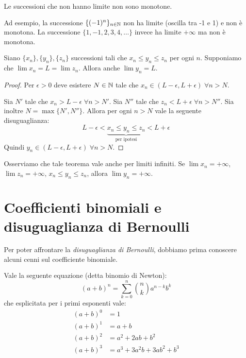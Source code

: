 \begin{remark}
Le successioni che non hanno limite non sono monotone.
\end{remark}
Ad esempio, la successione $\{(-1)^n\}_{n \in \mathbb N}$ non ha limite (oscilla tra -1 e 1) e non è monotona. La successione $\{1, -1, 2, 3, 4, \ldots \}$ invece ha limite $+\infty$ ma non è monotona.

\begin{theorem}
Siano $\{x_n\}, \{y_n\}, \{z_n\}$ successioni tali che $x_n \le y_n \le z_n$ per ogni $n$. Supponiamo che $\lim x_n = L = \lim z_n$. Allora anche $\lim y_n = L$.
\end{theorem}

\begin{proof}
Per $\epsilon > 0$ deve esistere $N \in \mathbb N$ tale che $x_n \in (L - \epsilon, L + \epsilon) \; \forall n>N$.

Sia $N'$ tale che $x_n > L - \epsilon \; \forall n > N'$. Sia $N''$ tale che $z_n < L + \epsilon \; \forall n > N''$. Sia inoltre $N = \max\{N', N''\}$.
Allora per ogni $n > N$ vale la seguente disuguaglianza:
\begin{equation*}
L - \epsilon < \underbrace{x_n \le y_n \le z_n}_{\text{per ipotesi}} < L + \epsilon
\end{equation*}
Quindi $y_n \in (L-\epsilon, L+\epsilon) \; \forall n > N$.
\end{proof}

\begin{remark}
Osserviamo che tale teorema vale anche per limiti infiniti. Se $\lim x_n = +\infty$, $\lim z_n = +\infty$, $x_n \le y_n \le z_n$, allora $\lim y_n = +\infty$.
\end{remark} 

\section{Coefficienti binomiali e disuguaglianza di Bernoulli}
Per poter affrontare la \emph{disuguaglianza di Bernoulli}, dobbiamo prima conoscere alcuni cenni sul coefficiente binomiale.

Vale la seguente equazione (detta binomio di Newton):
\begin{equation*}
(a+b)^n = \sum_{k=0}^n \binom{n}{k} a^{n-k}b^k
\end{equation*}
che esplicitata per i primi esponenti vale:
\begin{align*}
(a+b)^0 &= 1 \\
(a+b)^1 &= a + b \\
(a+b)^2 &= a^2 + 2ab + b^2 \\
(a+b)^3 &= a^3 + 3a^2b + 3ab^2 + b^3
\end{align*}

